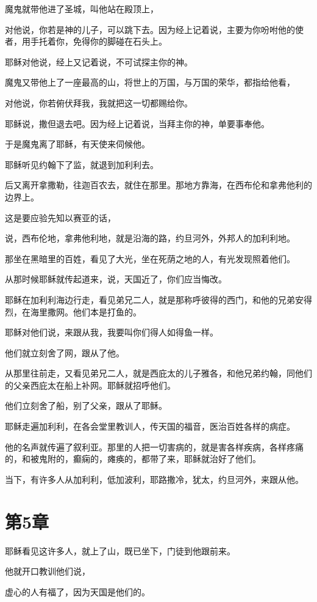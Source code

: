 \documentclass[12pt,oneside]{book}
\begin{document}
魔鬼就带他进了圣城，叫他站在殿顶上，

对他说，你若是神的儿子，可以跳下去。因为经上记着说，主要为你吩咐他的使者，用手托着你，免得你的脚碰在石头上。

耶稣对他说，经上又记着说，不可试探主你的神。

魔鬼又带他上了一座最高的山，将世上的万国，与万国的荣华，都指给他看，

对他说，你若俯伏拜我，我就把这一切都赐给你。

耶稣说，撒但退去吧。因为经上记着说，当拜主你的神，单要事奉他。

于是魔鬼离了耶稣，有天使来伺候他。

耶稣听见约翰下了监，就退到加利利去。

后又离开拿撒勒，往迦百农去，就住在那里。那地方靠海，在西布伦和拿弗他利的边界上。

这是要应验先知以赛亚的话，

说，西布伦地，拿弗他利地，就是沿海的路，约旦河外，外邦人的加利利地。

那坐在黑暗里的百姓，看见了大光，坐在死荫之地的人，有光发现照着他们。

从那时候耶稣就传起道来，说，天国近了，你们应当悔改。

耶稣在加利利海边行走，看见弟兄二人，就是那称呼彼得的西门，和他的兄弟安得烈，在海里撒网。他们本是打鱼的。

耶稣对他们说，来跟从我，我要叫你们得人如得鱼一样。

他们就立刻舍了网，跟从了他。

从那里往前走，又看见弟兄二人，就是西庇太的儿子雅各，和他兄弟约翰，同他们的父亲西庇太在船上补网。耶稣就招呼他们。

他们立刻舍了船，别了父亲，跟从了耶稣。

耶稣走遍加利利，在各会堂里教训人，传天国的福音，医治百姓各样的病症。

他的名声就传遍了叙利亚。那里的人把一切害病的，就是害各样疾病，各样疼痛的，和被鬼附的，癫痫的，瘫痪的，都带了来，耶稣就治好了他们。

当下，有许多人从加利利，低加波利，耶路撒冷，犹太，约旦河外，来跟从他。

\chapter{第5章}
耶稣看见这许多人，就上了山，既已坐下，门徒到他跟前来。

他就开口教训他们说，

虚心的人有福了，因为天国是他们的。
\end{document}
